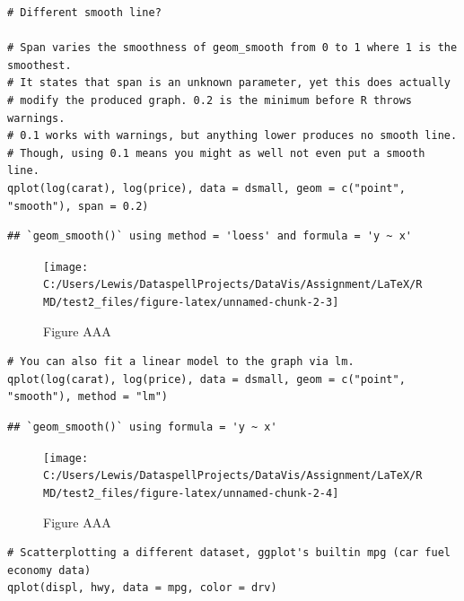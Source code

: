 \begin{verbatim}
# Different smooth line?

# Span varies the smoothness of geom_smooth from 0 to 1 where 1 is the smoothest.
# It states that span is an unknown parameter, yet this does actually
# modify the produced graph. 0.2 is the minimum before R throws warnings.
# 0.1 works with warnings, but anything lower produces no smooth line.
# Though, using 0.1 means you might as well not even put a smooth line.
qplot(log(carat), log(price), data = dsmall, geom = c("point", "smooth"), span = 0.2)
\end{verbatim}

\begin{verbatim}
## `geom_smooth()` using method = 'loess' and formula = 'y ~ x'
\end{verbatim}

\begin{figure}[H]

{\centering \texttt{[image: C:/Users/Lewis/DataspellProjects/DataVis/Assignment/LaTeX/RMD/test2\_files/figure-latex/unnamed-chunk-2-3]} 

}

\caption{Figure AAA}\label{fig:unnamed-chunk-2-3}
\end{figure}

\begin{verbatim}
# You can also fit a linear model to the graph via lm.
qplot(log(carat), log(price), data = dsmall, geom = c("point", "smooth"), method = "lm")
\end{verbatim}

\begin{verbatim}
## `geom_smooth()` using formula = 'y ~ x'
\end{verbatim}

\begin{figure}[H]

{\centering \texttt{[image: C:/Users/Lewis/DataspellProjects/DataVis/Assignment/LaTeX/RMD/test2\_files/figure-latex/unnamed-chunk-2-4]} 

}

\caption{Figure AAA}\label{fig:unnamed-chunk-2-4}
\end{figure}

\begin{verbatim}
# Scatterplotting a different dataset, ggplot's builtin mpg (car fuel economy data)
qplot(displ, hwy, data = mpg, color = drv)
\end{verbatim}

